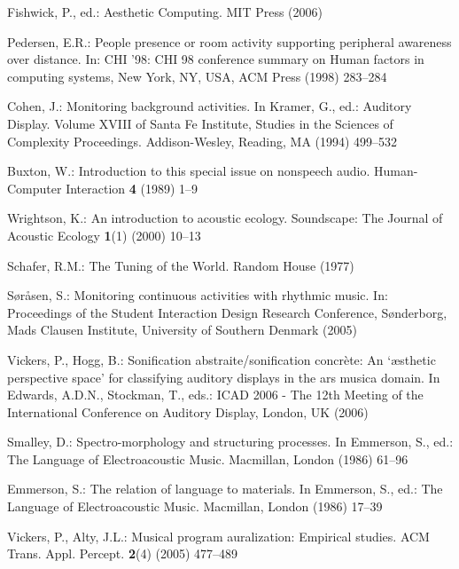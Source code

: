 \documentclass[runningheads]{llncs}
\begin{document}
\begin{thebibliography}{10}
Fishwick, P., ed.:
\newblock Aesthetic Computing.
\newblock MIT Press (2006)

Pedersen, E.R.:
\newblock People presence or room activity supporting peripheral awareness over
  distance.
\newblock In: CHI '98: CHI 98 conference summary on Human factors in computing
  systems, New York, NY, USA, ACM Press (1998)  283--284

Cohen, J.:
\newblock Monitoring background activities.
\newblock In Kramer, G., ed.: Auditory Display. Volume XVIII of Santa Fe
  Institute, Studies in the Sciences of Complexity Proceedings.
\newblock Addison-Wesley, Reading, MA (1994)  499--532 

Buxton, W.:
\newblock Introduction to this special issue on nonspeech audio.
\newblock Human-Computer Interaction \textbf{4} (1989)  1--9

Wrightson, K.:
\newblock An introduction to acoustic ecology.
\newblock Soundscape: The Journal of Acoustic Ecology \textbf{1}(1) (2000)
  10--13

Schafer, R.M.:
\newblock The Tuning of the World.
\newblock Random House (1977)

S{\o}r{\aa}sen, S.:
\newblock Monitoring continuous activities with rhythmic music.
\newblock In: Proceedings of the Student Interaction Design Research
  Conference, S{\o}nderborg, Mads Clausen Institute, University of Southern
  Denmark (2005)

Vickers, P., Hogg, B.:
\newblock Sonification abstraite/sonification concr{\`e}te: An `{\ae}sthetic
  perspective space' for classifying auditory displays in the ars musica
  domain.
\newblock In Edwards, A.D.N., Stockman, T., eds.: ICAD 2006 - The 12th Meeting
  of the International Conference on Auditory Display, London, UK (2006)

Smalley, D.:
\newblock Spectro-morphology and structuring processes.
\newblock In Emmerson, S., ed.: The Language of Electroacoustic Music.
\newblock Macmillan, London (1986)  61--96

Emmerson, S.:
\newblock The relation of language to materials.
\newblock In Emmerson, S., ed.: The Language of Electroacoustic Music.
\newblock Macmillan, London (1986)  17--39

Vickers, P., Alty, J.L.:
\newblock Musical program auralization: Empirical studies.
\newblock ACM Trans. Appl. Percept. \textbf{2}(4) (2005)  477--489


\end{thebibliography}
\end{document}
